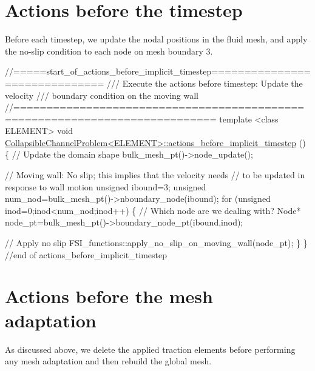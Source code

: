  

\hypertarget{index_beforestep}{}\section{Actions before the timestep}\label{index_beforestep}
Before each timestep, we update the nodal positions in the fluid mesh, and apply the no-\/slip condition to each node on mesh boundary 3.

 
\begin{DoxyCodeInclude}
\textcolor{comment}{//=====start\_of\_actions\_before\_implicit\_timestep==============================}
\textcolor{comment}{/// Execute the actions before timestep: Update the velocity}
\textcolor{comment}{}\textcolor{comment}{/// boundary condition on the moving wall}
\textcolor{comment}{}\textcolor{comment}{//============================================================================}
\textcolor{keyword}{template} <\textcolor{keyword}{class} ELEMENT>
\textcolor{keywordtype}{void} \hyperlink{classCollapsibleChannelProblem_a4c365050b11c184007b8e1cd6079147f}{CollapsibleChannelProblem<ELEMENT>::actions\_before\_implicit\_timestep}
      ()
\{
 \textcolor{comment}{// Update the domain shape}
 bulk\_mesh\_pt()->node\_update();
 
 \textcolor{comment}{// Moving wall: No slip; this implies that the velocity needs}
 \textcolor{comment}{// to be updated in response to wall motion}
 \textcolor{keywordtype}{unsigned} ibound=3;
 \textcolor{keywordtype}{unsigned} num\_nod=bulk\_mesh\_pt()->nboundary\_node(ibound);
  \textcolor{keywordflow}{for} (\textcolor{keywordtype}{unsigned} inod=0;inod<num\_nod;inod++)
  \{
   \textcolor{comment}{// Which node are we dealing with?}
   Node* node\_pt=bulk\_mesh\_pt()->boundary\_node\_pt(ibound,inod);
   
   \textcolor{comment}{// Apply no slip}
   FSI\_functions::apply\_no\_slip\_on\_moving\_wall(node\_pt);
  \}
\} \textcolor{comment}{//end of actions\_before\_implicit\_timestep}

\end{DoxyCodeInclude}




 

\hypertarget{index_beforeadapt}{}\section{Actions before the mesh adaptation}\label{index_beforeadapt}
As discussed above, we delete the applied traction elements before performing any mesh adaptation and then rebuild the global mesh.

